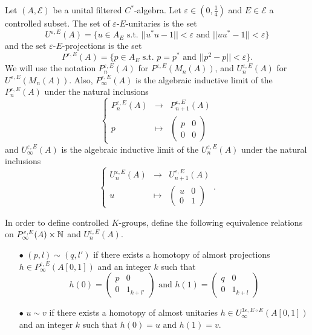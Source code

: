 \begin{definition}
Let $(A,\mathcal E)$ be a unital filtered $C^*$-algebra. Let $\varepsilon\in(0,\frac{1}{4})$ and $E\in \mathcal E$ a controlled subset. The set of $\varepsilon$-$E$-unitaries is the set 
\[U^{\varepsilon, E}(A)= \{u\in A_E \text{ s.t. } ||u^*u-1||<\varepsilon\text{ and }||uu^*-1||<\varepsilon \}\]
and the set $\varepsilon$-$E$-projections is the set 
\[P^{\varepsilon, E}(A)= \{p\in A_E \text{ s.t. } p=p^*\text{ and }||p^2-p||<\varepsilon \}.\]
We will use the notation $P_n^{\varepsilon, E}(A)$ for $P^{\varepsilon, E}(M_n(A))$, and $U_n^{\varepsilon, E}(A)$ for $U^{\varepsilon, E}(M_n(A))$. Also, $P_\infty^{\varepsilon, E}(A)$ is the algebraic inductive limit of the $P_n^{\varepsilon, E}(A)$ under the natural inclusions
\[\left\{\begin{array}{rcl}
	P^{\varepsilon,E}_n(A) 		& \rightarrow	& P^{\varepsilon,E}_{n+1}(A)\\ 
	p 		& \mapsto 	& \begin{pmatrix}p& 0 \\ 0&0 \end{pmatrix}
\end{array}\right.\]
and $U_\infty^{\varepsilon, E}(A)$ is the algebraic inductive limit of the $U_n^{\varepsilon, E}(A)$ under the natural inclusions
\[\left\{\begin{array}{rcl}
	U^{\varepsilon,E}_n(A) 		& \rightarrow	& U^{\varepsilon,E}_{n+1}(A)\\ 
	u 		& \mapsto 	& \begin{pmatrix}u & 0 \\ 0& 1 \end{pmatrix}
\end{array}\right. .\]
\end{definition}

In order to define controlled $K$-groups, define the following equivalence relations on $P^{\varepsilon, E}_\infty(A)\times \mathbb N$ and $U^{\varepsilon,E}_n(A)$.
\begin{itemize}

\item[$\bullet$] $(p,l) \sim (q,l')$ if there exists a homotopy of almost projections $h\in P^{\varepsilon, E}_\infty(A[0,1])$ and an integer $k$ such that 
\[h(0)=\begin{pmatrix} p & 0 \\ 0 & 1_{k+l'} \end{pmatrix} \text{ and }
h(1)=\begin{pmatrix} q & 0 \\ 0 & 1_{k+l} \end{pmatrix}\]
\item[$\bullet$] $u \sim v$ if there exists a homotopy of almost unitaries $h\in U^{3\varepsilon, E\circ E}_\infty(A[0,1])$ and an integer $k$ such that $h(0)= u \text{ and }h(1)=v$.\\
\end{itemize}

